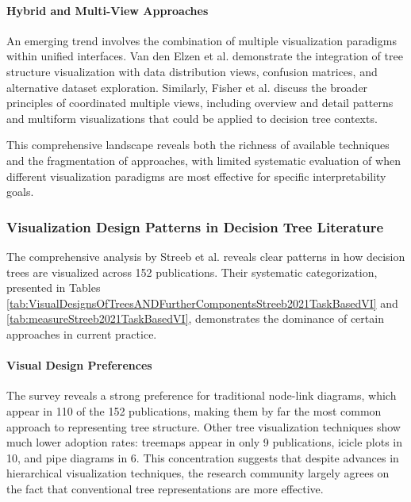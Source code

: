 \paragraph{Hybrid and Multi-View Approaches}

An emerging trend involves the combination of multiple visualization paradigms within unified interfaces. Van den Elzen et al. \cite{elzen2011baobabview} demonstrate the integration of tree structure visualization with data distribution views, confusion matrices, and alternative dataset exploration. Similarly, Fisher et al. \cite{fisher2012making} discuss the broader principles of coordinated multiple views, including overview and detail patterns and multiform visualizations that could be applied to decision tree contexts.

This comprehensive landscape reveals both the richness of available techniques and the fragmentation of approaches, with limited systematic evaluation of when different visualization paradigms are most effective for specific interpretability goals.

\subsubsection{Visualization Design Patterns in Decision Tree Literature}

The comprehensive analysis by Streeb et al. \cite{Streeb2021TaskBasedVI} reveals clear patterns in how decision trees are visualized across 152 publications. Their systematic categorization, presented in Tables \ref{tab:VisualDesignsOfTreesANDFurtherComponentsStreeb2021TaskBasedVI} and \ref{tab:measureStreeb2021TaskBasedVI}, demonstrates the dominance of certain approaches in current practice.

\paragraph{Visual Design Preferences}
The survey reveals a strong preference for traditional node-link diagrams, which appear in 110 of the 152 publications, making them by far the most common approach to representing tree structure. Other tree visualization techniques show much lower adoption rates: treemaps appear in only 9 publications, icicle plots in 10, and pipe diagrams in 6. This concentration suggests that despite advances in hierarchical visualization techniques, the research community largely agrees on the fact that conventional tree representations are more effective.

